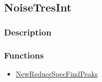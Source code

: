 \subsection{NoiseTresInt}\label{NoiseTresInt}
\subsubsection{Description}

\subsubsection{Functions}
\begin{itemize}
\item \hyperref[NewReduceSpecFindPeaks]{NewReduceSpecFindPeaks}
\end{itemize}

